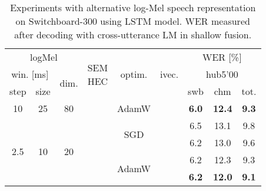\documentclass[a4paper]{article}
\begin{document}
\begin{table}
  \eightpt
  \centering
  \caption{Experiments with alternative log-Mel speech representation on Switchboard-300 using LSTM model. WER measured after decoding with cross-utterance LM in shallow fusion.}
  \vspace{-3.5mm}
  \begin{tabular}{|c|c|@{}c@{}|@{}c@{}|@{}c@{}|@{}c@{}||c|c|c|}
    \hline
\multicolumn{3}{|c|}{logMel}             &\multirow{3}{*}{\parbox[c]{6mm}{SEM\\HEC}}&  \multirow{3}{*}{\hspace{2mm}optim.\hspace{2mm}} & \multirow{3}{*}{\hspace{0.8mm}ivec.\hspace{0.8mm}} & \multicolumn{3}{c|}{WER [\%]} \\ \cline{7-9} \cline{1-3}
\multicolumn{2}{|c|}{win. [ms]}                 & \multirow{2}{*}{dim.} &      &              &        &  \multicolumn{3}{c|}{hub5'00} \\ \cline{1-2}\cline{7-9}
     step      &  size      &        & \hspace{7mm} & \hspace{2mm} &        &   swb   &  chm   & tot. \\
\hline
\hline
     10        &   25      & \hspace{1.7mm}80\hspace{1.7mm} &                                &  AdamW         &                   & {\bf 6.0} & \bf{12.4} & \bf{9.3} \\
\hline
\hline
\multirow{4}{*}{2.5} & \multirow{4}{*}{10} & \multirow{4}{*}{20} &                                & \multirow{2}{*}{SGD}           &                               & 6.5     & 13.1   & 9.8  \\ \cline{4-4} \cline{7-9}
               &           &             &  \multirow{3}{*}{} &              &                               & 6.2     & 13.0   & 9.6  \\ \cline{5-5}\cline{7-9}
               &           &             &                                & \multirow{2}{*}{AdamW}        &                               & 6.2     & 12.3   & 9.3  \\ \cline{6-6}\cline{7-9}
               &           &             &                                &              & \multirow{1}{*}{} & \bf 6.2 & \bf 12.0 & \bf 9.1  \\
\hline
\end{tabular}                              
\label{tab:hires}
\vspace{-4mm}
\end{table}
\end{document}
